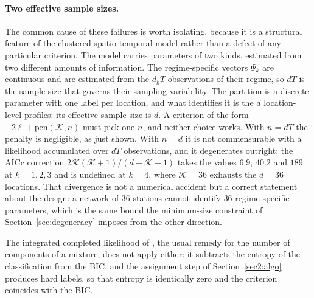 \paragraph{Two effective sample sizes.} The common cause of these failures is worth isolating, because it is a structural feature of the clustered spatio-temporal model rather than a defect of any particular criterion. The model carries parameters of two kinds, estimated from two different amounts of information. The regime-specific vectors $\Psi_k$ are continuous and are estimated from the $d_k T$ observations of their regime, so $dT$ is the sample size that governs their sampling variability. The partition is a discrete parameter with one label per location, and what identifies it is the $d$ location-level profiles: its effective sample size is $d$. A criterion of the form $-2\ell + \mathrm{pen}(\mathcal{K}, n)$ must pick one $n$, and neither choice works. With $n = dT$ the penalty is negligible, as just shown. With $n = d$ it is not commensurable with a likelihood accumulated over $dT$ observations, and it degenerates outright: the AICc correction $2\mathcal{K}(\mathcal{K}+1)/(d - \mathcal{K} - 1)$ takes the values $6.9$, $40.2$ and $189$ at $k = 1, 2, 3$ and is undefined at $k = 4$, where $\mathcal{K} = 36$ exhausts the $d = 36$ locations. That divergence is not a numerical accident but a correct statement about the design: a network of $36$ stations cannot identify $36$ regime-specific parameters, which is the same bound the minimum-size constraint of Section~\ref{sec:degeneracy} imposes from the other direction.

The integrated completed likelihood of \citet{BiernackiEtAl2000}, the usual remedy for the number of components of a mixture, does not apply either: it subtracts the entropy of the classification from the BIC, and the assignment step of Section~\ref{sec2:algo} produces hard labels, so that entropy is identically zero and the criterion coincides with the BIC.

